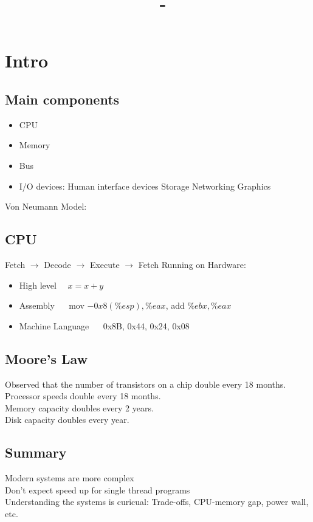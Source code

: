 \documentclass[answers,12pt,addpoints]{exam}
\author{\name}
\title{\course \ - \assignment}
\begin{document}
\maketitle
\tableofcontents
\newpage
\section{Intro}
\subsection{Main components}
\begin{itemize}
    \item CPU
    \item Memory
    \item Bus
    \item I/O  devices: 
    \subitem Human interface devices
    \subitem Storage 
    \subitem Networking
    \subitem Graphics
\end{itemize}
Von Neumann Model: \\
\subsection{CPU}
Fetch $\to$ Decode $\to$ Execute $\to$ Fetch
Running on Hardware: \begin{itemize}
    \item High level $\quad x = x+y$
    \item Assembly $\quad$ mov $-0x8(\%esp), \%eax$, add $\%ebx, \%eax$
    \item Machine Language $\quad$ 0x8B, 0x44, 0x24, 0x08
\end{itemize}
\subsection{Moore's Law}
Observed that the number of transistors on a chip double every 18 months. \\
Processor speeds double every 18 months. \\
Memory capacity doubles every 2 years. \\
Disk capacity doubles every year. \\
\subsection{Summary}
Modern systems are more complex\\
Don't expect speed up for single thread programs\\
Understanding the systems is curicual: Trade-offs, CPU-memory gap, power wall, etc. \\ 
\end{document}
